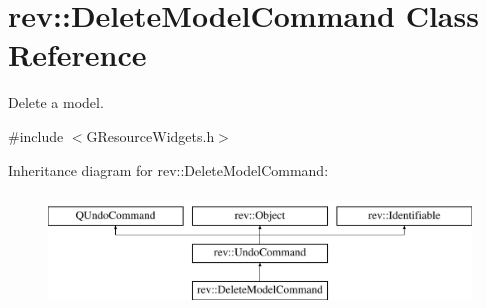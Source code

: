 \hypertarget{classrev_1_1_delete_model_command}{}\section{rev\+::Delete\+Model\+Command Class Reference}
\label{classrev_1_1_delete_model_command}


Delete a model.  




{\ttfamily \#include $<$G\+Resource\+Widgets.\+h$>$}

Inheritance diagram for rev\+::Delete\+Model\+Command\+:\begin{figure}[H]
\begin{center}
\leavevmode
\includegraphics[height=3.000000cm]{classrev_1_1_delete_model_command}
\end{center}
\end{figure}
